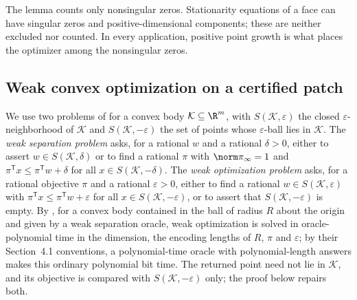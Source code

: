 The lemma counts only nonsingular zeros. Stationarity equations of a face
can have singular zeros and positive-dimensional components; these are
neither excluded nor counted. In every application, positive point growth is
what places the optimizer among the nonsingular zeros.

\subsection{Weak convex optimization on a certified patch}\label{app:sp:eval}

We use two problems of \citet[Section~2.1]{grotschel1988-geometric-algorithms-and-combinatorial-optimization}
for a convex body $\mathcal K\subseteq\R^m$, with
$S(\mathcal K,\varepsilon)$ the closed $\varepsilon$-neighborhood of
$\mathcal K$ and $S(\mathcal K,-\varepsilon)$ the set of points whose
$\varepsilon$-ball lies in $\mathcal K$. The \emph{weak separation problem}
asks, for a rational $w$ and a rational $\delta>0$, either to assert
$w\in S(\mathcal K,\delta)$ or to find a rational $\pi$ with
$\norm\pi_\infty=1$ and $\pi^{\mathsf T}x\le\pi^{\mathsf T}w+\delta$ for all
$x\in S(\mathcal K,-\delta)$. The \emph{weak optimization problem} asks, for
a rational objective $\pi$ and a rational $\varepsilon>0$, either to find a
rational $w\in S(\mathcal K,\varepsilon)$ with
$\pi^{\mathsf T}x\le\pi^{\mathsf T}w+\varepsilon$ for all
$x\in S(\mathcal K,-\varepsilon)$, or to assert that
$S(\mathcal K,-\varepsilon)$ is empty. By
\citet[Corollary~4.2.7]{grotschel1988-geometric-algorithms-and-combinatorial-optimization}, for a convex body
contained in the ball of radius $R$ about the origin and given by a weak
separation oracle, weak optimization is solved in oracle-polynomial time in
the dimension, the encoding lengths of $R$, $\pi$ and $\varepsilon$; by
their Section~4.1 conventions, a polynomial-time oracle with
polynomial-length answers makes this ordinary polynomial bit time. The
returned point need not lie in $\mathcal K$, and its objective is compared
with $S(\mathcal K,-\varepsilon)$ only; the proof below repairs both.

